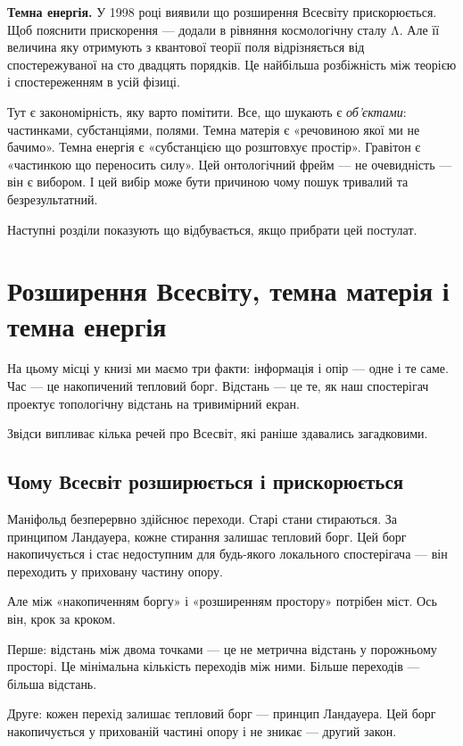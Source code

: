 \documentclass[12pt, a4paper, openany]{book}
\begin{document}
\textbf{Темна енергія.} У 1998 році виявили що розширення Всесвіту прискорюється. Щоб пояснити прискорення — додали в рівняння космологічну сталу Λ. Але її величина яку отримують з квантової теорії поля відрізняється від спостережуваної на сто двадцять порядків. Це найбільша розбіжність між теорією і спостереженням в усій фізиці.

Тут є закономірність, яку варто помітити. Все, що шукають є \textit{об'єктами}: частинками, субстанціями, полями. Темна матерія є «речовиною якої ми не бачимо». Темна енергія є «субстанцією що розштовхує простір». Гравітон є «частинкою що переносить силу». Цей онтологічний фрейм — не очевидність — він є вибором. І цей вибір може бути причиною чому пошук тривалий та безрезультатний.

Наступні розділи показують що відбувається, якщо прибрати цей постулат.

\chapter{Розширення Всесвіту, темна матерія і темна енергія}

На цьому місці у книзі ми маємо три факти: інформація і опір --- одне і те саме. Час --- це накопичений тепловий борг. Відстань --- це те, як наш спостерігач проектує топологічну відстань на тривимірний екран.

Звідси випливає кілька речей про Всесвіт, які раніше здавались загадковими.

\section{Чому Всесвіт розширюється і прискорюється}

Маніфольд безперервно здійснює переходи. Старі стани стираються. За принципом Ландауера, кожне стирання залишає тепловий борг. Цей борг накопичується і стає недоступним для будь-якого локального спостерігача --- він переходить у приховану частину опору.

Але між «накопиченням боргу» і «розширенням простору» потрібен міст. Ось він, крок за кроком.

Перше: відстань між двома точками — це не метрична відстань у порожньому просторі. Це мінімальна кількість переходів між ними. Більше переходів — більша відстань.

Друге: кожен перехід залишає тепловий борг — принцип Ландауера. Цей борг накопичується у прихованій частині опору і не зникає — другий закон.
\end{document}
